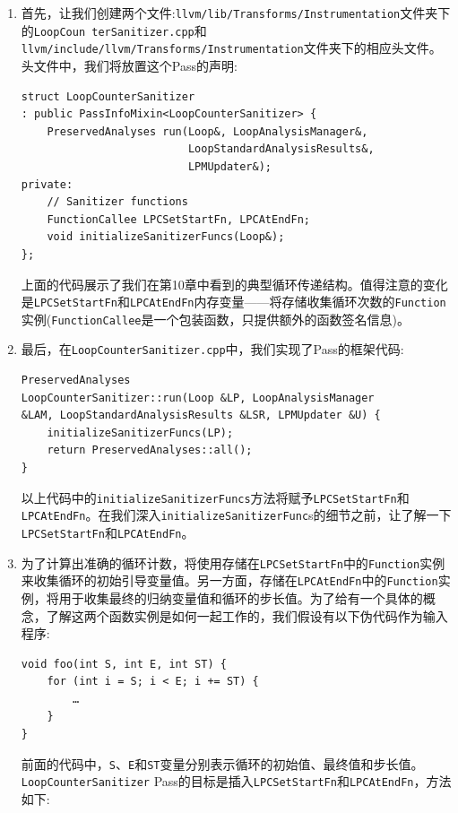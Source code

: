 \begin{enumerate}
\item 首先，让我们创建两个文件:\texttt{llvm/lib/Transforms/Instrumentation}文件夹下的\texttt{LoopCoun terSanitizer.cpp}和\texttt{llvm/include/llvm/Transforms/Instrumentation}文件夹下的相应头文件。头文件中，我们将放置这个Pass的声明:

\begin{lstlisting}[style=styleCXX]
struct LoopCounterSanitizer
: public PassInfoMixin<LoopCounterSanitizer> {
	PreservedAnalyses run(Loop&, LoopAnalysisManager&,
						  LoopStandardAnalysisResults&,
						  LPMUpdater&);
private:
	// Sanitizer functions
	FunctionCallee LPCSetStartFn, LPCAtEndFn;
	void initializeSanitizerFuncs(Loop&);
};
\end{lstlisting}

上面的代码展示了我们在第10章中看到的典型循环传递结构。值得注意的变化是\texttt{LPCSetStartFn}和\texttt{LPCAtEndFn}内存变量——将存储收集循环次数的\texttt{Function}实例(\texttt{FunctionCallee}是一个包装函数，只提供额外的函数签名信息)。

\item 最后，在\texttt{LoopCounterSanitizer.cpp}中，我们实现了Pass的框架代码:

\begin{lstlisting}[style=styleCXX]
PreservedAnalyses
LoopCounterSanitizer::run(Loop &LP, LoopAnalysisManager
&LAM, LoopStandardAnalysisResults &LSR, LPMUpdater &U) {
	initializeSanitizerFuncs(LP);
	return PreservedAnalyses::all();
}
\end{lstlisting}

以上代码中的\texttt{initializeSanitizerFuncs}方法将赋予\texttt{LPCSetStartFn}和\texttt{LPCAtEndFn}。在我们深入\texttt{initializeSanitizerFunc}s的细节之前，让了解一下\texttt{LPCSetStartFn}和\texttt{LPCAtEndFn}。

\item 为了计算出准确的循环计数，将使用存储在\texttt{LPCSetStartFn}中的\texttt{Function}实例来收集循环的初始引导变量值。另一方面，存储在\texttt{LPCAtEndFn}中的\texttt{Function}实例，将用于收集最终的归纳变量值和循环的步长值。为了给有一个具体的概念，了解这两个函数实例是如何一起工作的，我们假设有以下伪代码作为输入程序:

\begin{lstlisting}[style=styleCXX]
void foo(int S, int E, int ST) {
	for (int i = S; i < E; i += ST) {
		…
	}
}
\end{lstlisting}

前面的代码中，\texttt{S}、\texttt{E}和\texttt{ST}变量分别表示循环的初始值、最终值和步长值。\texttt{LoopCounterSanitizer} Pass的目标是插入\texttt{LPCSetStartFn}和\texttt{LPCAtEndFn}，方法如下:


\end{enumerate}
